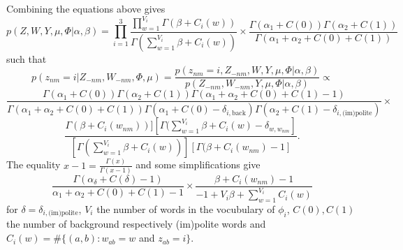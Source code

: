 \documentclass[11pt, english]{article}
\begin{document}
Combining the equations above gives
\[
p(Z,W,Y,\mu,\Phi|\alpha,\beta)= \prod_{i=1}^3 \frac{\prod_{w=1}^{V_i}\Gamma(\beta+C_i(w))}{\Gamma(\sum_{w=1}^{V_i}\beta+C_i(w))}\times \frac{\Gamma(\alpha_1+C(0))\Gamma(\alpha_2+C(1))}{\Gamma(\alpha_1+\alpha_2+C(0)+C(1))}
\]
such that 
\[
p(z_{nm}=i|Z_{-nm}, W_{-nm}, \Phi,\mu)= \frac{p(z_{nm}=i,Z_{-nm},W,Y,\mu,\Phi|\alpha,\beta)}{p(Z_{-nm},W_{-nm},Y,\mu,\Phi|\alpha,\beta)}\propto
\]
\[
\frac{\Gamma(\alpha_1+C(0))\Gamma(\alpha_2+C(1))\Gamma(\alpha_1+\alpha_2+C(0)+C(1)-1)}{\Gamma(\alpha_1+\alpha_2+C(0)+C(1))\Gamma(\alpha_1+C(0)-\delta_{i,\text{back}})\Gamma(\alpha_2+C(1)-\delta_{i,\text{(im)polite}})} \times
\]
\[
\frac{\Gamma(\beta+C_i(w_{nm}))][\Gamma(\sum_{w=1}^{V_i}\beta+C_i(w)-\delta_{w,w_{nm}}]}{[\Gamma(\sum_{w=1}^{V_i}\beta+C_i(w))][\Gamma(\beta+C_i(w_{nm})-1]}.
\]
The equality $x-1=\frac{\Gamma(x)}{\Gamma(x-1)}$ and some simplifications give
\[
\frac{\Gamma(\alpha_\delta+C(\delta)-1)}{\alpha_1+\alpha_2+C(0)+C(1)-1}
\times \frac{\beta+C_i(w_{nm})-1}{-1+V_i\beta + \sum_{w=1}^{V_i} C_i(w)}
\]
for $\delta = \delta_{i,\text{(im)polite}}$, $V_i$ the number of words in the vocubulary of $\phi_i$, $C(0),C(1)$ the number of background respectively (im)polite words and $C_i(w) = \#\{(a,b):w_{ab}=w$ and $z_{ab}=i\}$.
\end{document}
